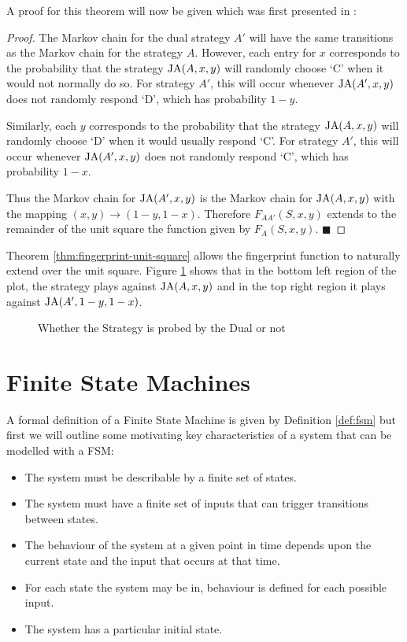 A proof for this theorem will now be given which was first presented in \cite{Ashlock2004}:
\begin{proof}\label{prf:fingerprint-unit-square}
The Markov chain for the dual strategy $A'$ will have the same transitions as the Markov chain for the strategy $A$.
However, each entry for $x$ corresponds to the probability that the strategy $\text{JA}(A, x, y)$ will randomly choose `C' when it would not normally do so.
For strategy $A'$, this will occur whenever $\text{JA}(A', x, y)$ does not randomly respond `D', which has probability $1 - y$.

Similarly, each $y$ corresponds to the probability that the strategy $\text{JA}(A, x, y)$ will randomly choose `D' when it would usually respond `C'.
For strategy $A'$, this will occur whenever $\text{JA}(A', x, y)$ does not randomly respond `C', which has probability $1 - x$.

Thus the Markov chain for $\text{JA}(A', x, y)$ is the Markov chain for $\text{JA}(A, x, y)$ with the mapping $(x, y) \rightarrow (1-y, 1-x)$.
Therefore $F_{AA'}(S, x, y)$ extends to the remainder of the unit square the function given by $F_A(S, x, y)$. $\blacksquare$
\end{proof}

Theorem \ref{thm:fingerprint-unit-square} allows the fingerprint function to naturally extend over the unit square.
Figure \ref{fig:DualProbe} shows that in the \textcolor{sol-violet}{bottom left} region of the plot, the strategy plays against $\text{JA}(A, x, y)$ and in the \textcolor{sol-cyan}{top right} region it plays against $\text{JA}(A', 1-y, 1-x)$.

\begin{figure}[!hbtp]
    \begin{center}
        
        \caption{Whether the Strategy is probed by the Dual or not}\label{fig:DualProbe}
    \end{center}
\end{figure}

\section{Finite State Machines}\label{sec:fsm}

A formal definition of a Finite State Machine is given by Definition \ref{def:fsm} but first we will outline some motivating key characteristics of a system that can be modelled with a FSM:

\begin{itemize}
 \item The system must be describable by a finite set of states.
 \item The system must have a finite set of inputs that can trigger transitions between states.
 \item The behaviour of the system at a given point in time depends upon the current state and the input that occurs at that time.
 \item For each state the system may be in, behaviour is defined for each possible input.
 \item The system has a particular initial state.
\end{itemize}

